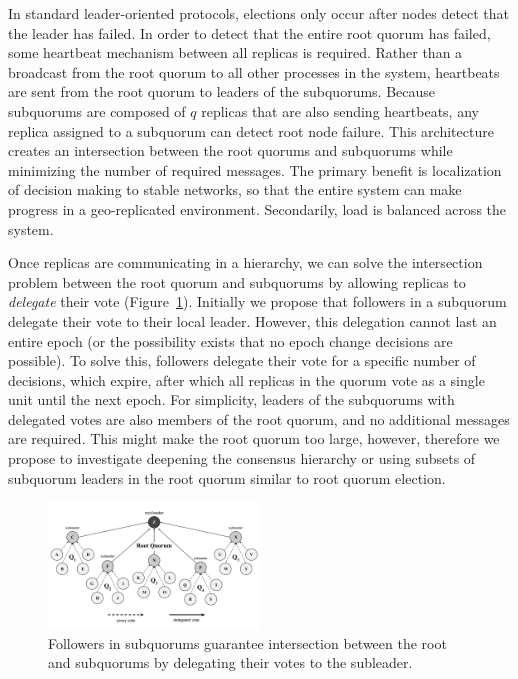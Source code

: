 \documentclass[sigconf]{acmart}
\begin{document}
In standard leader-oriented protocols, elections only occur after nodes detect that the
leader has failed.
In order to detect that the entire root quorum has failed, some heartbeat mechanism
between all replicas is required.
Rather than a broadcast from the root quorum to all other processes in the system,
heartbeats are sent from the root quorum to leaders of the subquorums.
Because subquorums are composed of $q$ replicas that are also sending heartbeats, any
replica assigned to a subquorum can detect root node failure.
This architecture creates an intersection between the root quorums and subquorums while
minimizing the number of required messages.
The primary benefit is
localization of decision making to stable networks, so that the entire system can make
progress in a geo-replicated environment.
Secondarily, load is balanced across the system.


Once replicas are communicating in a hierarchy, we can solve the intersection problem
between the root quorum and subquorums by allowing replicas to \emph{delegate} their
vote (Figure~\ref{fig:delegates}).
Initially we propose that followers in a subquorum delegate their vote to their local
leader.
However, this delegation cannot last an entire epoch (or the possibility exists that no
epoch change decisions are possible).
To solve this, followers delegate their vote for a specific number of decisions, which
expire, after which all replicas in the quorum vote as a single unit until the next
epoch.
For simplicity, leaders of the subquorums with delegated votes are also members of
the root quorum, and no additional messages are required.
This might make the root quorum too large, however, therefore we propose to investigate
deepening the consensus hierarchy or using subsets of subquorum leaders in the root
quorum similar to root quorum election.

\begin{figure}[t]
    \centering
    \includegraphics[width=0.5\textwidth]{figures/delegates}
    \caption{Followers in subquorums guarantee
      intersection between the root and subquorums by delegating their votes to the subleader.}
    \label{fig:delegates}
\end{figure}
\end{document}
